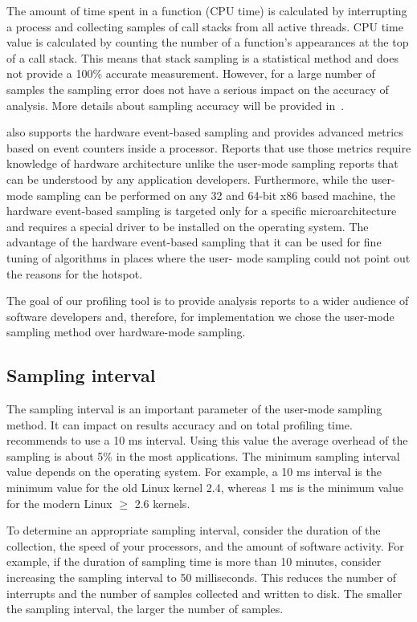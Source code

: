The amount of time spent in a function (CPU time) is calculated by interrupting
a process and collecting samples of call stacks from all active threads. CPU
time value is calculated by counting the number of  a function's appearances at
the top of a call stack. This means that stack sampling is a statistical method
and does not provide a 100\% accurate measurement. However, for a large number
of samples the sampling error does not have a serious impact on the accuracy of
analysis. More details about sampling accuracy will be provided
in~.

\amp also supports the hardware event-based sampling and provides advanced
metrics based on event counters inside a processor. Reports that use those
metrics require  knowledge of hardware architecture  unlike the user-mode
sampling reports that can be understood by any application developers.
Furthermore, while the user-mode sampling can be performed on any 32 and 64-bit
x86 based machine, the hardware event-based sampling is targeted only for a
specific \intel microarchitecture and requires a special driver to be installed
on the operating system. The advantage of the hardware event-based sampling
that it can be used for fine tuning of algorithms in places where  the user-
mode sampling could not point out the reasons for the hotspot.

The goal of our profiling tool is to provide analysis reports to a wider
audience of software developers and, therefore, for implementation we chose the
user-mode sampling method over hardware-mode sampling.

\subsection{Sampling interval}

The sampling interval is an important parameter of the user-mode sampling
method. It can impact on results accuracy and on total profiling time. \intel
recommends to use a 10 ms interval. Using this value the average overhead of
the sampling is about 5\% in the most applications. The minimum sampling
interval value depends on the operating system. For example, a 10 ms interval
is the minimum value for the old Linux kernel 2.4, whereas 1 ms is the minimum
value for the modern Linux $\ge$ 2.6 kernels.

To determine an appropriate sampling interval, consider the duration of the
collection, the speed of your processors, and the amount of software activity.
For example, if the duration of sampling time is more than 10 minutes, consider
increasing the sampling interval to 50 milliseconds. This reduces the number of
interrupts and the number of samples collected and written to disk. The smaller
the sampling interval, the larger the number of samples.

